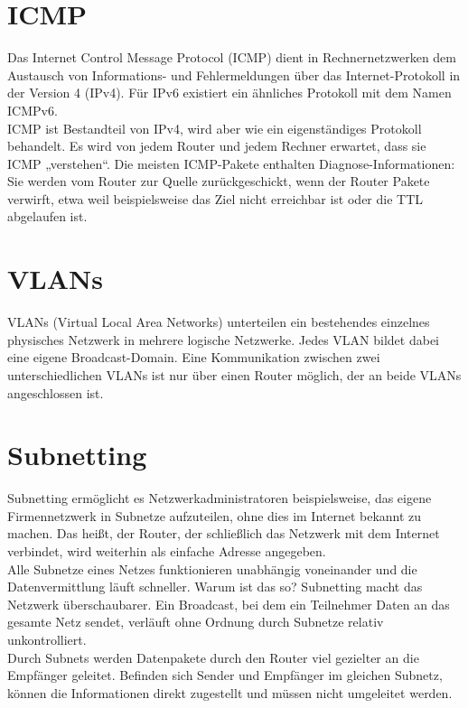 \documentclass[12pt,a4paper]{article}
\begin{document}
		\section{ICMP}
		Das Internet Control Message Protocol (ICMP) dient in Rechnernetzwerken dem Austausch von Informations- und Fehlermeldungen über das Internet-Protokoll in der Version 4 (IPv4). Für IPv6 existiert ein ähnliches Protokoll mit dem Namen ICMPv6.\\
		ICMP ist Bestandteil von IPv4, wird aber wie ein eigenständiges Protokoll behandelt. Es wird von jedem Router und jedem Rechner erwartet, dass sie ICMP „verstehen“. Die meisten ICMP-Pakete enthalten Diagnose-Informationen: Sie werden vom Router zur Quelle zurückgeschickt, wenn der Router Pakete verwirft, etwa weil beispielsweise das Ziel nicht erreichbar ist oder die TTL abgelaufen ist.

		\section{VLANs}
		VLANs (Virtual Local Area Networks) unterteilen ein bestehendes einzelnes physisches Netzwerk in mehrere logische Netzwerke. Jedes VLAN bildet dabei eine eigene Broadcast-Domain. Eine Kommunikation zwischen zwei unterschiedlichen VLANs ist nur über einen Router möglich, der an beide VLANs angeschlossen ist.
		
		\section{Subnetting}
			Subnetting ermöglicht es Netzwerkadministratoren beispielsweise, das eigene Firmennetzwerk in Subnetze aufzuteilen, ohne dies im Internet bekannt zu machen. Das heißt, der Router, der schließlich das Netzwerk mit dem Internet verbindet, wird weiterhin als einfache Adresse angegeben.\vspace{.2cm}\\
			Alle Subnetze eines Netzes funktionieren unabhängig voneinander und die Datenvermittlung läuft schneller. Warum ist das so? Subnetting macht das Netzwerk überschaubarer. Ein Broadcast, bei dem ein Teilnehmer Daten an das gesamte Netz sendet, verläuft ohne Ordnung durch Subnetze relativ unkontrolliert.\vspace{.2cm}\\
			Durch Subnets werden Datenpakete durch den Router viel gezielter an die Empfänger geleitet. Beﬁnden sich Sender und Empfänger im gleichen Subnetz, können die Informationen direkt zugestellt und müssen nicht umgeleitet werden.
		
\end{document}
